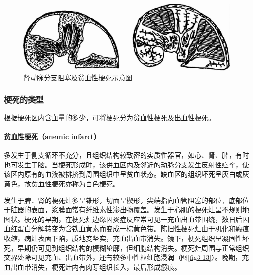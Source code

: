 \begin{figure}[!htbp]
  \centering
  \includegraphics{./images/Image00046.jpg}
  \caption{肾动脉分支阻塞及贫血性梗死示意图}
  \label{fig3-12}
\end{figure}


\subsubsection{梗死的类型}

根据梗死区内含血量的多少，可将梗死分为贫血性梗死及出血性梗死。

\paragraph{贫血性梗死（anemic infarct）}
多发生于侧支循环不充分，且组织结构较致密的实质性器官，如心、肾、脾，有时也可发生于脑。当梗死形成时，该供血区内及邻近的动脉分支发生反射性痉挛，使该区内原有的血液被排挤到周围组织中呈贫血状态。缺血区的组织坏死呈灰白或灰黄色，故贫血性梗死亦称为白色梗死。

发生于脾、肾的梗死灶多呈锥形，切面呈楔形，尖端指向血管阻塞的部位，底部位于脏器的表面，浆膜面常有纤维素性渗出物覆盖。发生于心肌的梗死灶呈不规则地图状。梗死的早期，在梗死灶边缘因炎症反应常可见一充血出血带围绕，数日后因血红蛋白分解转变为含铁血黄素而变成一棕黄色带。陈旧性梗死灶由于机化和瘢痕收缩，病灶表面下陷，质地变坚实，充血出血带消失。镜下，梗死组织呈凝固性坏死，早期仍可见到组织结构的模糊轮廓，但细胞结构消失。梗死灶周围与正常组织交界处除可见充血、出血带外，还有较多中性粒细胞浸润（图\ref{fig3-13}）。晚期，充血出血带消失，梗死灶内有肉芽组织长入，最后形成瘢痕。

